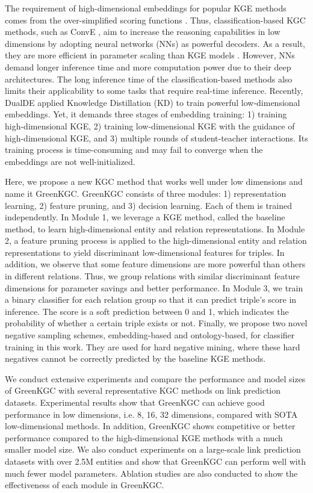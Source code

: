 \documentclass{article}
\begin{document}
The requirement of high-dimensional embeddings for popular KGE methods comes
from the over-simplified scoring functions \citep{xiao2015transa}.
Thus, classification-based KGC methods, such as ConvE
\citep{dettmers2018convolutional}, aim to increase the reasoning
capabilities in low dimensions by adopting neural networks (NNs)
as powerful decoders. As a result, they are more efficient in parameter 
scaling than KGE models \citep{dettmers2018convolutional}. However, NNs 
demand longer inference time and more computation power due to their deep 
architectures. The long inference time of the classification-based methods also 
limits their applicability to some tasks that require real-time inference. 
Recently, DualDE \citep{zhu2022dualde} applied Knowledge Distillation (KD) 
\citep{hinton2015distill} to train powerful low-dimensional embeddings. 
Yet, it demands three stages of embedding training: 1) training
high-dimensional KGE, 2) training low-dimensional KGE with the guidance
of high-dimensional KGE, and 3) multiple rounds of student-teacher
interactions. Its training process is time-consuming and may fail to 
converge when the embeddings are not well-initialized. 

Here, we propose a new KGC method that works well under low dimensions
and name it GreenKGC. GreenKGC consists of three modules: 1)
representation learning, 2) feature pruning, and 3) decision learning.
Each of them is trained independently. In Module 1, we leverage a KGE
method, called the baseline method, to learn high-dimensional entity and
relation representations. In Module 2, a feature pruning process is
applied to the high-dimensional entity and relation representations to
yield discriminant low-dimensional features for triples. In addition, we
observe that some feature dimensions are more powerful than others in 
different relations. Thus, we group relations with similar discriminant 
feature dimensions for parameter savings and better performance.
In Module 3, we train a binary classifier for each relation group so that it can
predict triple's score in inference. The score is a soft prediction
between 0 and 1, which indicates the probability of whether a certain
triple exists or not. Finally, we propose two novel negative sampling schemes, 
embedding-based and ontology-based, for classifier training in this work.
They are used for hard negative mining, where these hard negatives cannot be 
correctly predicted by the baseline KGE methods. 

We conduct extensive
experiments and compare the performance and model sizes of GreenKGC with
several representative KGC methods on link prediction datasets. 
Experimental results show that GreenKGC can achieve good performance
in low dimensions, i.e. 8, 16, 32 dimensions, compared with SOTA 
low-dimensional methods. In addition, GreenKGC shows competitive or
better performance compared to the high-dimensional KGE methods 
with a much smaller model size. We also conduct experiments on
a large-scale link prediction datasets with over 2.5M entities
and show that GreenKGC can perform well with much fewer model 
parameters.
Ablation studies are also conducted to show 
the effectiveness of each module in GreenKGC.
\end{document}
